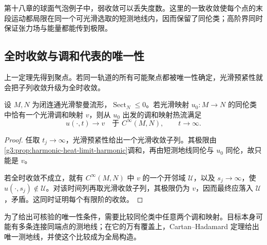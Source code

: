 第十八章的球面气泡例子中，弱收敛可以丢失度数。这里的一致收敛使每个点的末段运动都局限在同一个可光滑选取的短测地线内，因而保留了同伦类；高阶界同时保证张力场与能量都能传到极限。

\subsection{全时收敛与调和代表的唯一性}
\label{g3:subsec:2605:05}
上一定理先得到聚点。若同一轨道的所有可能聚点都被唯一性确定，光滑预紧性就会把子列收敛升级为全时收敛。

\begin{proposition}\label{g3:prop:harmonic-heat-unique-limit}
	设 \(M,N\) 为闭连通光滑黎曼流形，\(\operatorname{Sect}_N\le0\)。若光滑映射 \(u_0:M\to N\) 的同伦类中恰有一个光滑调和映射 \(v\)，则从 \(u_0\) 出发的调和映射热流满足
	\[
		u(\cdot,t)\longrightarrow v\quad\text{于 }C^\infty(M,N),
		\qquad t\to\infty.
	\]
\end{proposition}
\begin{proof}
	任取 \(t_j\to\infty\)，光滑预紧性给出一个光滑收敛子列。其极限由\cref{g3:prop:harmonic-heat-limit-harmonic}调和，再由短测地线同伦与 \(u_0\) 同伦，故只能是 \(v\)。

	若全时收敛不成立，就有 \(C^\infty(M,N)\) 中 \(v\) 的一个开邻域 \(\mathcal U\)，以及 \(s_j\to\infty\)，使 \(u(\cdot,s_j)\notin\mathcal U\)。对该时间列再取光滑收敛子列，其极限仍为 \(v\)，因而最终应落入 \(\mathcal U\)，矛盾。这同时证明每个有限阶的收敛。
\end{proof}

为了给出可核验的唯一性条件，需要比较同伦类中任意两个调和映射。目标本身可能有多条连接同端点的测地线；在它的万有覆盖上，Cartan--Hadamard 定理给出唯一测地线，并使这个比较成为全局构造。


